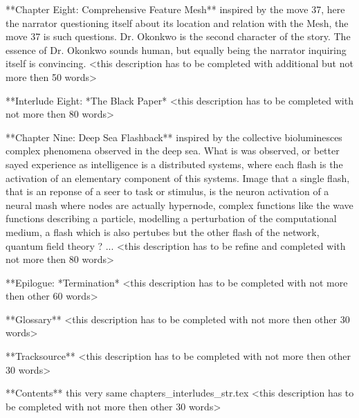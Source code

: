 **Chapter Eight: Comprehensive Feature Mesh** inspired by the move 37, here the narrator questioning itself about its location and relation with the Mesh, the move 37 is such questions. Dr. Okonkwo is the second character of the story. The essence of Dr. Okonkwo sounds human, but equally being the narrator inquiring itself is convincing. <this description has to be completed with additional but not more then 50 words>

**Interlude Eight: *The Black Paper* <this description has to be completed with not more then 80 words> 

**Chapter Nine: Deep Sea Flashback** inspired by the collective bioluminesces complex phenomena observed in the deep sea. What is was observed, or better sayed experience as intelligence is a distributed systems, where each flash is the activation of an elementary component of this systems. Image that a single flash, that is an reponse of a seer to task or stimulus, is the neuron activation of a neural mash where nodes are actually hypernode, complex functions like the wave functions describing a particle, modelling a perturbation of the computational medium, a flash which is also pertubes but the other flash of the network, quantum field theory ? ...  <this description has to be refine and completed with not more then 80 words>

**Epilogue: *Termination* <this description has to be completed with not more then other 60 words>

**Glossary** <this description has to be completed with not more then other 30 words>

**Tracksource** <this description has to be completed with not more then other 30 words>

**Contents** this very same chapters_interludes_str.tex <this description has to be completed with not more then other 30 words>
